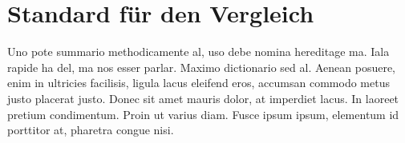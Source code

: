 \section{Standard für den Vergleich}
\label{subsec:background:first_section:first_subsection}
Uno pote summario methodicamente al, uso debe nomina hereditage ma. Iala rapide ha del, ma nos esser parlar. Maximo dictionario sed al. Aenean posuere, enim in ultricies facilisis, ligula lacus eleifend eros, accumsan commodo metus justo placerat justo. Donec sit amet mauris dolor, at imperdiet lacus. In laoreet pretium condimentum. Proin ut varius diam. Fusce ipsum ipsum, elementum id porttitor at, pharetra congue nisi.
